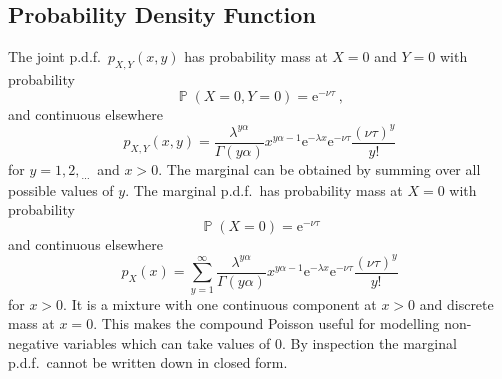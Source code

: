 \documentclass[a4paper]{proc}
\DeclareMathOperator{\prob}{\mathbb{P}}
\newcommand{\euler}{\mathrm{e}}
\newcommand{\dotdotdot}{_{\phantom{.}\cdots}}
\begin{document}
\subsection{Probability Density Function}
The joint p.d.f.~$p_{X,Y}(x,y)$ has probability mass at $X=0$ and $Y=0$ with probability
\begin{equation}
\prob\left(X=0,Y=0\right)=\euler^{-\nu\tau} \ ,
\end{equation}
and continuous elsewhere
\begin{equation}
p_{X,Y}(x,y)=\frac{\lambda^{y\alpha}}{\Gamma(y\alpha)}x^{y\alpha-1}\euler^{-\lambda x}\euler^{-\nu\tau}\frac{(\nu\tau)^y}{y!}
\end{equation}
for $y=1,2,\dotdotdot$ and $x>0$. The marginal can be obtained by summing over all possible values of $y$. The marginal p.d.f.~has probability mass at $X=0$ with probability
\begin{equation}
\prob(X=0)=\euler^{-\nu\tau}
\end{equation}
and continuous elsewhere
\begin{equation}
p_{X}(x)=\sum_{y=1}^{\infty}\frac{\lambda^{y\alpha}}{\Gamma(y\alpha)}x^{y\alpha-1}\euler^{-\lambda x}\euler^{-\nu\tau}\frac{(\nu\tau)^y}{y!}
\end{equation}
for $x>0$. It is a mixture with one continuous component at $x>0$ and discrete mass at $x=0$. This makes the compound Poisson useful for modelling non-negative variables which can take values of 0. By inspection the marginal p.d.f.~cannot be written down in closed form.
\end{document}
